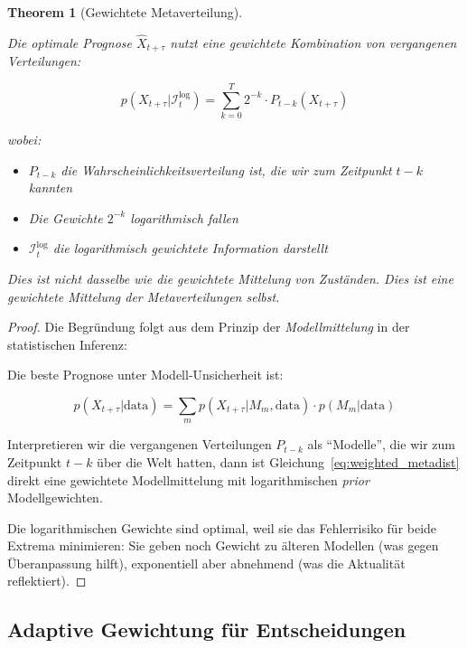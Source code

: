 \documentclass[a4paper, 12pt, twoside, openright]{report}
\newtheorem{theorem}{Theorem}[section]
\theoremstyle{definition}
\theoremstyle{definition}
\begin{document}
\begin{theorem}[Gewichtete Metaverteilung]
\label{thm:weighted_metadistribution}

Die optimale Prognose $\hat{X}_{t+\tau}$ nutzt eine gewichtete Kombination von vergangenen Verteilungen:

\begin{equation}
p(X_{t+\tau} | \mathcal{I}_t^{\log}) = \sum_{k=0}^{T} 2^{-k} \cdot P_{t-k}(X_{t+\tau})
\label{eq:weighted_metadist}
\end{equation}

wobei:
\begin{itemize}
  \item $P_{t-k}$ die Wahrscheinlichkeitsverteilung ist, die wir zum Zeitpunkt $t-k$ kannten
  \item Die Gewichte $2^{-k}$ logarithmisch fallen
  \item $\mathcal{I}_t^{\log}$ die logarithmisch gewichtete Information darstellt
\end{itemize}

Dies ist \emph{nicht} dasselbe wie die gewichtete Mittelung von Zuständen. Dies ist eine gewichtete Mittelung der Metaverteilungen selbst.
\end{theorem}

\begin{proof}
Die Begründung folgt aus dem Prinzip der \emph{Modellmittelung} in der statistischen Inferenz:

Die beste Prognose unter Modell-Unsicherheit ist:

\begin{equation}
p(X_{t+\tau} | \text{data}) = \sum_m p(X_{t+\tau} | M_m, \text{data}) \cdot p(M_m | \text{data})
\label{eq:model_averaging}
\end{equation}

Interpretieren wir die vergangenen Verteilungen $P_{t-k}$ als ``Modelle'', die wir zum Zeitpunkt $t-k$ über die Welt hatten, dann ist Gleichung~\ref{eq:weighted_metadist} direkt eine gewichtete Modellmittelung mit logarithmischen \emph{prior} Modellgewichten.

Die logarithmischen Gewichte sind optimal, weil sie das Fehlerrisiko für beide Extrema minimieren: Sie geben noch Gewicht zu älteren Modellen (was gegen Überanpassung hilft), exponentiell aber abnehmend (was die Aktualität reflektiert).
\end{proof}

\subsection{Adaptive Gewichtung für Entscheidungen}
\end{document}
